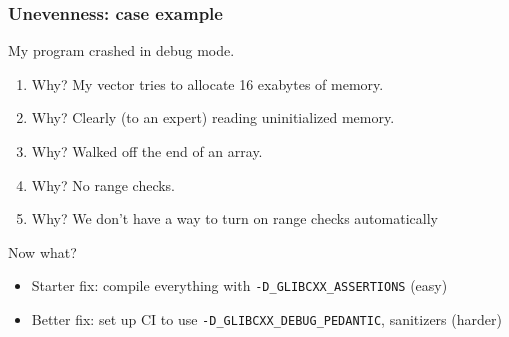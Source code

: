 \documentclass[8pt]{beamer}
\begin{document}
\begin{frame}
  \frametitle{Unevenness: case example}

  My program crashed in debug mode.
  \begin{enumerate}
    \item Why? My vector tries to allocate 16 exabytes of memory.
    \item Why? Clearly (to an expert) reading uninitialized memory.
    \item Why? Walked off the end of an array.
    \item Why? No range checks.
    \item Why? We don't have a way to turn on range checks automatically
  \end{enumerate}

  \vfill

  Now what?

  \begin{itemize}
    \item Starter fix: compile everything with
      \texttt{-D\_GLIBCXX\_ASSERTIONS} (easy)
    \item Better fix: set up CI to use \texttt{-D\_GLIBCXX\_DEBUG\_PEDANTIC},
      sanitizers (harder)
  \end{itemize}
\end{frame}
\end{document}
